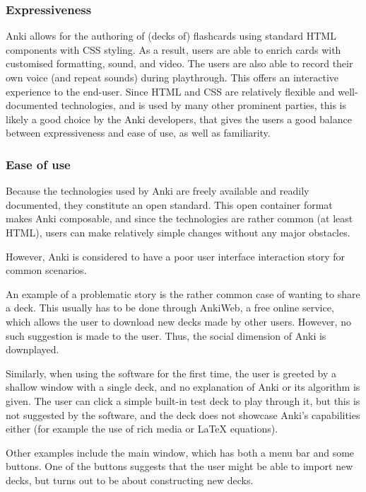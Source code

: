 \subsubsection{Expressiveness}

Anki allows for the authoring of (decks of) flashcards using standard HTML
components with CSS styling. As a result, users are able to enrich cards with
customised formatting, sound, and video. The users are also able to record their
own voice (and repeat sounds) during playthrough. This offers an interactive
experience to the end-user. Since HTML and CSS are relatively flexible and
well-documented technologies, and is used by many other prominent parties, 
this is likely a good choice by the Anki developers, that gives the users a 
good balance between expressiveness and ease of use, as well as familiarity.

\subsubsection{Ease of use}

Because the technologies used by Anki are freely available and readily
documented, they constitute an open standard. This open container format makes
Anki composable, and since the technologies are rather common (at least HTML),
users can make relatively simple changes without any major obstacles.

However, Anki is considered to have a poor user interface interaction story 
for common scenarios\cite{pcworldanki}.

An example of a problematic story is the rather common case of wanting to share
a deck. This usually has to be done through AnkiWeb, a free online service, 
which allows the user to download new decks made by other users. However, no such
suggestion is made to the user. Thus, the social dimension of Anki is 
downplayed.

Similarly, when using the software for the first time, the user is greeted by 
a shallow window with a single deck, and no explanation of Anki or its 
algorithm is given. The user can click a simple built-in test deck to play 
through it, but this is not suggested by the software, and the deck does not 
showcase Anki's capabilities either (for example the use of rich media or 
LaTeX equations).

Other examples include the main window, which has both a menu bar and some
buttons. One of the buttons suggests that the user might be able to import new
decks, but turns out to be about constructing new decks.


